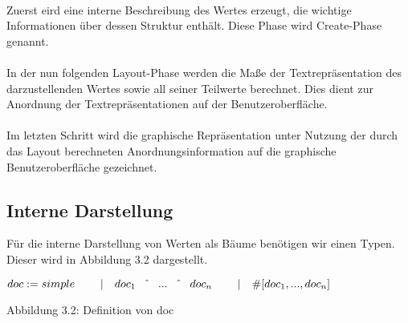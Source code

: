 \documentclass[12pt,a4paper]{article}
\begin{document}
\paragraph{}

Zuerst eird eine interne Beschreibung des Wertes erzeugt, die
wichtige Informationen \"uber dessen Struktur enth\"alt. Diese
Phase wird Create-Phase genannt.

\paragraph{}    

In der nun folgenden Layout-Phase werden die Ma\ss e der 
Textrepr\"asentation des darzustellenden Wertes sowie 
all seiner Teilwerte berechnet. Dies dient zur Anordnung 
der Textrepr\"asentationen auf der Benutzeroberfl\"ache.

\paragraph{}

Im letzten Schritt wird die graphische Repr\"asentation 
unter Nutzung der durch das Layout berechneten Anordnungsinformation 
auf die graphische Benutzeroberfl\"ache gezeichnet. 

\subsection{Interne Darstellung}

\label{intern}

F\"ur die interne Darstellung von Werten als B\"aume ben\"otigen wir einen 
Typen. Dieser wird in Abbildung 3.2 dargestellt.\\[1mm]

\begin{minipage}{15cm}
\begin{math}
doc :=  simple \newline
\hspace*{8mm} | \quad  doc_{1} \quad \hat{} \quad ... \quad \hat{} 
                \quad doc_{n} \newline       
\hspace*{8mm} | \quad \# \lbrack doc_{1}, ... , doc_{n}\rbrack 
\end{math} \newline
\end{minipage}
Abbildung 3.2: Definition von doc

\paragraph{}
\end{document}
